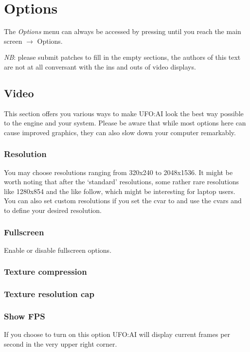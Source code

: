 \section{Options}
The \emph{Options} menu can always be accessed by pressing  until you reach the main screen $\rightarrow$ Options.

\emph{NB}: please submit patches to fill in the empty sections, the authors of this text are not at all conversant with the ins and outs of video displays.

\subsection{Video}
This section offers you various ways to make UFO:AI look the best way possible to the engine and your system. Please be aware that while most options here can cause improved graphics, they can also slow down your computer remarkably.

\subsubsection*{Resolution}
You may choose resolutions ranging from 320x240 to 2048x1536. It might be worth noting that after the `standard' resolutions, some rather rare resolutions like 1280x854 and the like follow, which might be interesting for laptop users. You can also set custom resolutions if you set the cvar  to  and use the cvars  and  to define your desired resolution.

\subsubsection*{Fullscreen}
Enable or disable fullscreen options.

\subsubsection*{Texture compression}
\subsubsection*{Texture resolution cap}
\subsubsection*{Show FPS}
If you choose to turn on this option UFO:AI will display current frames per second in the very upper right corner.
